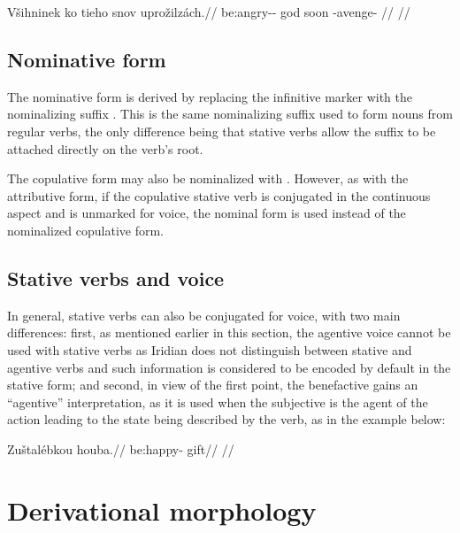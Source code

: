 \ex
\begingl
\gla Všihninek ko tieho snov uprožilzách.//
\glb be:angry-\Pv{}-\Pf{} \Att{} god soon \Refl{}-avenge- //
\glft {}//
\endgl
\xe


\subsection{Nominative form}
The nominative form is derived by replacing the infinitive marker  with the nominalizing suffix . This is the same nominalizing suffix used to form nouns from regular verbs, the only difference being that stative verbs allow the suffix to be attached directly on the verb's root.

The copulative form may also be nominalized with . However, as with the attributive form, if the copulative stative verb is conjugated in the continuous aspect and is unmarked for voice, the nominal form is used instead of the nominalized copulative form.

\subsection{Stative verbs and voice}

In general, stative verbs can also be conjugated for voice, with two main differences: first, as mentioned earlier in this section, the agentive voice cannot be used with stative verbs as Iridian does not distinguish between stative and agentive verbs and such information is considered to be encoded by default in the stative form; and second, in view of the first point, the benefactive gains an ``agentive'' interpretation, as it is used when the subjective is the agent of the action leading to the state being described by the verb, as in the example below:

\ex
\begingl
\gla Zuštal\'ebkou houba.//
\glb be:happy- gift//
\glft {}//
\endgl
\xe



\section{Derivational morphology}
